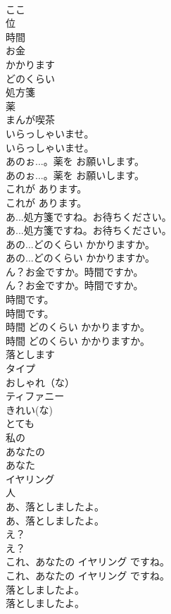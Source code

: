 \documentclass[8pt]{extreport}
\begin{document}
\begin{CJK}{UTF8}{min}
\\	ここ
\\	位
\\	時間
\\	お金
\\	かかります
\\	どのくらい
\\	処方箋
\\	薬
\\	まんが喫茶
\\	いらっしゃいませ。	
\\	いらっしゃいませ。 
\\	あのぉ...。薬を お願いします。	
\\	あのぉ...。薬を お願いします。 
\\	これが あります。	
\\	これが あります。 
\\	あ...処方箋ですね。お待ちください。	
\\	あ...処方箋ですね。お待ちください。 
\\	あの...どのくらい かかりますか。	
\\	あの...どのくらい かかりますか。 
\\	ん？お金ですか。時間ですか。	
\\	ん？お金ですか。時間ですか。 
\\	時間です。	
\\	時間です。 
\\	時間 どのくらい かかりますか。	
\\	時間 どのくらい かかりますか。 
\\	落とします
\\	タイプ
\\	おしゃれ（な）
\\	ティファニー
\\	きれい(な)
\\	とても
\\	私の
\\	あなたの
\\	あなた
\\	イヤリング
\\	人
\\	あ、落としましたよ。	
\\	あ、落としましたよ。 
\\	え？	
\\	え？ 
\\	これ、あなたの イヤリング ですね。	
\\	これ、あなたの イヤリング ですね。 
\\	落としましたよ。	
\\	落としましたよ。 

\end{CJK}
\end{document}
